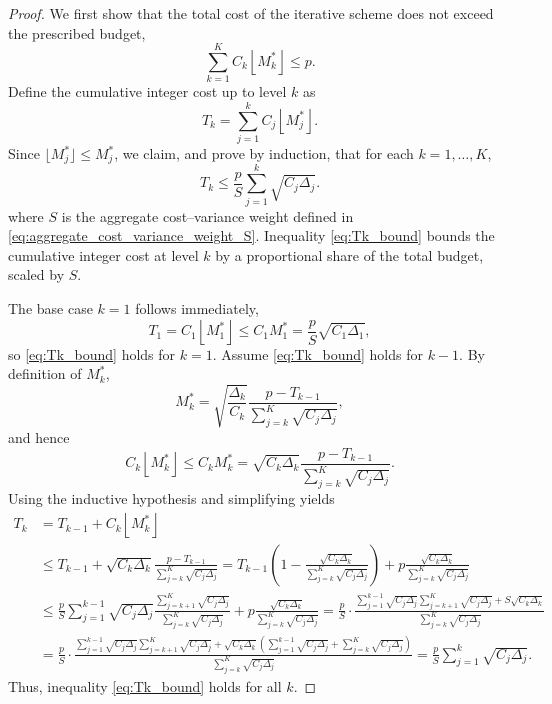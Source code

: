 \begin{proof}
We first show that the total cost of the iterative scheme does not exceed the prescribed budget,
\[
\sum_{k=1}^K C_k \left\lfloor M_k^* \right\rfloor \le p.
\]
Define the cumulative integer cost up to level $k$ as
\[
T_k = \sum_{j=1}^k C_j\left\lfloor M_j^* \right\rfloor.
\]
Since $\lfloor M_j^* \rfloor \le M_j^*$, we claim, and prove by induction, that for each $k = 1, \ldots, K$,
\begin{equation}\label{eq:Tk_bound}
T_k \le \frac{p}{S}\sum_{j=1}^k \sqrt{C_j \Delta_j}.
\end{equation}
where $S$ is the aggregate cost–variance weight defined in \eqref{eq:aggregate_cost_variance_weight_S}. 
Inequality \eqref{eq:Tk_bound} bounds the cumulative integer cost at level $k$ by a proportional share of the total budget, scaled by $S$.







The base case $k=1$ follows immediately,
\[
T_1=C_1 \left\lfloor M_1^* \right\rfloor \le C_1M_1^* = \frac{p}{S}\sqrt{C_1\Delta_1},
\]
so \eqref{eq:Tk_bound} holds for \(k=1\). Assume \eqref{eq:Tk_bound} holds for \(k-1\). By definition of \(M_k^*\),
%
\[
M_k^* = \sqrt{\frac{\Delta_k}{C_k}}\frac{p - T_{k-1}}{\sum_{j=k}^K \sqrt{C_j\Delta_j}},
\]
%
and hence
%
\[
C_k \left\lfloor M_k^* \right\rfloor \le C_k M_k^*  = \sqrt{C_k\Delta_k}\frac{p-T_{k-1}}{\sum_{j=k}^K\sqrt{C_j\Delta_j}}.
\]
%
Using the inductive hypothesis and simplifying yields
\begin{align*}
    T_k &= T_{k-1}+C_k\left\lfloor M_k^* \right\rfloor \\
    &\le T_{k-1} + \sqrt{C_k\Delta_k}\frac{p-T_{k-1}}{\sum_{j=k}^K\sqrt{C_j\Delta_j}}
    =T_{k-1}\left(1-\frac{\sqrt{C_k\Delta_k}}{\sum_{j=k}^K\sqrt{C_j\Delta_j}}\right) + p\frac{\sqrt{C_k\Delta_k}}{\sum_{j=k}^K\sqrt{C_j\Delta_j}}\\
    &\le \frac{p}{S}\sum_{j=1}^{k-1} \sqrt{C_j\Delta_j}\frac{\sum_{j=k+1}^K\sqrt{C_j\Delta_j}}{\sum_{j=k}^K\sqrt{C_j\Delta_j}}+p\frac{\sqrt{C_k\Delta_k}}{\sum_{j=k}^K\sqrt{C_j\Delta_j}}=\frac{p}{S}\cdot \frac{\sum_{j=1}^{k-1} \sqrt{C_j\Delta_j}\sum_{j=k+1}^K\sqrt{C_j\Delta_j}+S\sqrt{C_k\Delta_k}}{\sum_{j=k}^K\sqrt{C_j\Delta_j}}\\
    &=\frac{p}{S}\cdot \frac{\sum_{j=1}^{k-1} \sqrt{C_j\Delta_j}\sum_{j=k+1}^K\sqrt{C_j\Delta_j}+\sqrt{C_k\Delta_k}\left(\sum_{j=1}^{k-1}\sqrt{C_j\Delta_j}+\sum_{j=k}^K\sqrt{C_j\Delta_j}\right)}{\sum_{j=k}^K\sqrt{C_j\Delta_j}}
    =\frac{p}{S}\sum_{j=1}^k\sqrt{C_j\Delta_j}.
\end{align*}
%
Thus, inequality \eqref{eq:Tk_bound} holds for all $k$. 


\end{proof}
